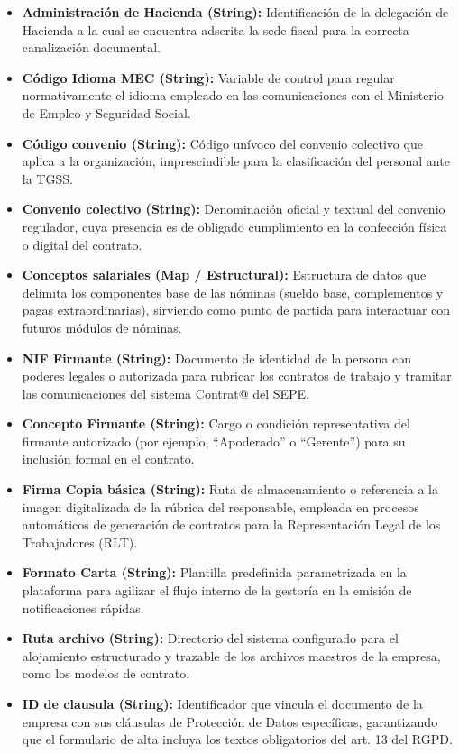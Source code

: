 \begin{itemize}
    \item \textbf{Administración de Hacienda (String):} Identificación de la delegación de Hacienda a la cual se encuentra adscrita la sede fiscal para la correcta canalización documental.
    \item \textbf{Código Idioma MEC (String):} Variable de control para regular normativamente el idioma empleado en las comunicaciones con el Ministerio de Empleo y Seguridad Social.
    \item \textbf{Código convenio (String):} Código unívoco del convenio colectivo que aplica a la organización, imprescindible para la clasificación del personal ante la TGSS.
    \item \textbf{Convenio colectivo (String):} Denominación oficial y textual del convenio regulador, cuya presencia es de obligado cumplimiento en la confección física o digital del contrato.
    \item \textbf{Conceptos salariales (Map / Estructural):} Estructura de datos que delimita los componentes base de las nóminas (sueldo base, complementos y pagas extraordinarias), sirviendo como punto de partida para interactuar con futuros módulos de nóminas.
    \item \textbf{NIF Firmante (String):} Documento de identidad de la persona con poderes legales o autorizada para rubricar los contratos de trabajo y tramitar las comunicaciones del sistema Contrat@ del SEPE.
    \item \textbf{Concepto Firmante (String):} Cargo o condición representativa del firmante autorizado (por ejemplo, ``Apoderado'' o ``Gerente'') para su inclusión formal en el contrato.
    \item \textbf{Firma Copia básica (String):} Ruta de almacenamiento o referencia a la imagen digitalizada de la rúbrica del responsable, empleada en procesos automáticos de generación de contratos para la Representación Legal de los Trabajadores (RLT).
    \item \textbf{Formato Carta (String):} Plantilla predefinida parametrizada en la plataforma para agilizar el flujo interno de la gestoría en la emisión de notificaciones rápidas.
    \item \textbf{Ruta archivo (String):} Directorio del sistema configurado para el alojamiento estructurado y trazable de los archivos maestros de la empresa, como los modelos de contrato.
    \item \textbf{ID de clausula (String):} Identificador que vincula el documento de la empresa con sus cláusulas de Protección de Datos específicas, garantizando que el formulario de alta incluya los textos obligatorios del art. 13 del RGPD.
\end{itemize}

